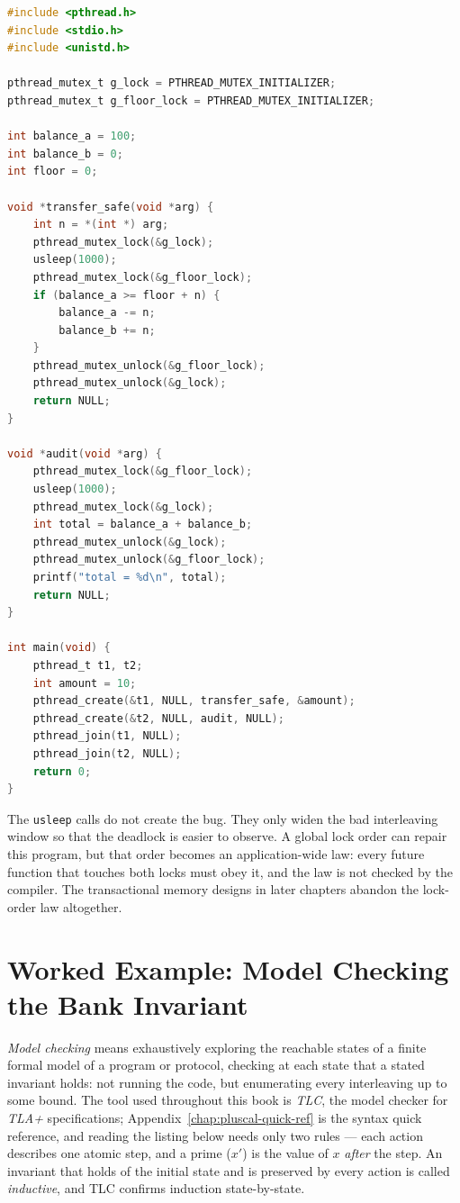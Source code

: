 \begin{lstlisting}[language=C, caption={A compilable two-lock deadlock. Build with \texttt{cc -std=c11 -pthread deadlock.c -o deadlock}.}, label={lst:two-lock-deadlock}]
#include <pthread.h>
#include <stdio.h>
#include <unistd.h>

pthread_mutex_t g_lock = PTHREAD_MUTEX_INITIALIZER;
pthread_mutex_t g_floor_lock = PTHREAD_MUTEX_INITIALIZER;

int balance_a = 100;
int balance_b = 0;
int floor = 0;

void *transfer_safe(void *arg) {
    int n = *(int *) arg;
    pthread_mutex_lock(&g_lock);
    usleep(1000);
    pthread_mutex_lock(&g_floor_lock);
    if (balance_a >= floor + n) {
        balance_a -= n;
        balance_b += n;
    }
    pthread_mutex_unlock(&g_floor_lock);
    pthread_mutex_unlock(&g_lock);
    return NULL;
}

void *audit(void *arg) {
    pthread_mutex_lock(&g_floor_lock);
    usleep(1000);
    pthread_mutex_lock(&g_lock);
    int total = balance_a + balance_b;
    pthread_mutex_unlock(&g_lock);
    pthread_mutex_unlock(&g_floor_lock);
    printf("total = %d\n", total);
    return NULL;
}

int main(void) {
    pthread_t t1, t2;
    int amount = 10;
    pthread_create(&t1, NULL, transfer_safe, &amount);
    pthread_create(&t2, NULL, audit, NULL);
    pthread_join(t1, NULL);
    pthread_join(t2, NULL);
    return 0;
}
\end{lstlisting}

The \texttt{usleep} calls do not create the bug. They only widen the bad
interleaving window so that the deadlock is easier to observe. A global lock
order can repair this program, but that order becomes an application-wide law:
every future function that touches both locks must obey it, and the law is not
checked by the compiler. The transactional memory designs in later chapters
abandon the lock-order law altogether.

\section{Worked Example: Model Checking the Bank Invariant}

\emph{Model checking} means exhaustively exploring the reachable states of a
finite formal model of a program or protocol, checking at each state that a
stated invariant holds: not running the code, but enumerating every
interleaving up to some bound. The tool used throughout this book is
\emph{TLC}, the model checker for \emph{TLA+} specifications;
Appendix~\ref{chap:pluscal-quick-ref} is the syntax quick reference, and reading the
listing below needs only two rules --- each action describes one atomic step,
and a prime ($x'$) is the value of $x$ \emph{after} the step. An invariant
that holds of the initial state and is preserved by every action is called
\emph{inductive}, and TLC confirms induction state-by-state.

